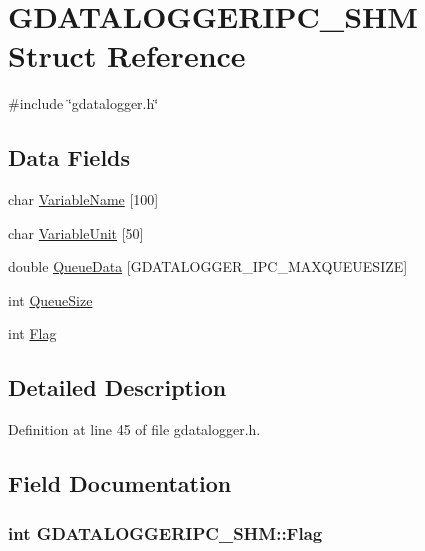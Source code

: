 \hypertarget{structGDATALOGGERIPC__SHM}{
\section{GDATALOGGERIPC\_\-SHM Struct Reference}
\label{structGDATALOGGERIPC__SHM}
}


{\ttfamily \#include \char`\"{}gdatalogger.h\char`\"{}}

\subsection*{Data Fields}
\begin{DoxyCompactItemize}
\item 
char \hyperlink{structGDATALOGGERIPC__SHM_afb130e15f688a18e52e2037f4bb17e89}{VariableName} \mbox{[}100\mbox{]}
\item 
char \hyperlink{structGDATALOGGERIPC__SHM_a8efd7b2ed8ff087f9694cb47a8c25a13}{VariableUnit} \mbox{[}50\mbox{]}
\item 
double \hyperlink{structGDATALOGGERIPC__SHM_ac495752de142e6697c08f713505ed55c}{QueueData} \mbox{[}GDATALOGGER\_\-IPC\_\-MAXQUEUESIZE\mbox{]}
\item 
int \hyperlink{structGDATALOGGERIPC__SHM_a7d392777d231e1b0cece66cb51b0945b}{QueueSize}
\item 
int \hyperlink{structGDATALOGGERIPC__SHM_a346eca077a97246740a6ed4f7c08833c}{Flag}
\end{DoxyCompactItemize}


\subsection{Detailed Description}


Definition at line 45 of file gdatalogger.h.



\subsection{Field Documentation}
\hypertarget{structGDATALOGGERIPC__SHM_a346eca077a97246740a6ed4f7c08833c}{
\subsubsection[{Flag}]{\setlength{\rightskip}{0pt plus 5cm}int {\bf GDATALOGGERIPC\_\-SHM::Flag}}}
\label{structGDATALOGGERIPC__SHM_a346eca077a97246740a6ed4f7c08833c}


